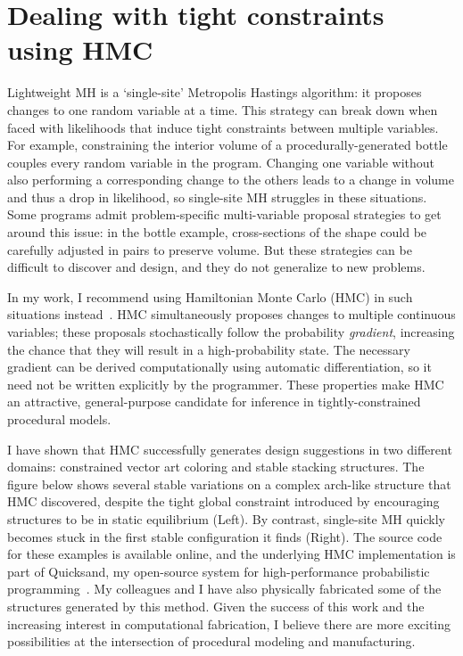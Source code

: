 \documentclass[
10pt, %
a4paper, %
oneside, %
headinclude,footinclude, %
BCOR5mm, %
]{scrartcl}
\begin{document}
\section*{Dealing with tight constraints using HMC}

Lightweight MH is a `single-site' Metropolis Hastings algorithm: it proposes changes to one random variable at a time. This strategy can break down when faced with likelihoods that induce tight constraints between multiple variables. For example, constraining the interior volume of a procedurally-generated bottle couples every random variable in the program. Changing one variable without also performing a corresponding change to the others leads to a change in volume and thus a drop in likelihood, so single-site MH struggles in these situations. Some programs admit problem-specific multi-variable proposal strategies to get around this issue: in the bottle example, cross-sections of the shape could be carefully adjusted in pairs to preserve volume. But these strategies can be difficult to discover and design, and they do not generalize to new problems.

In my work, I recommend using Hamiltonian Monte Carlo (HMC) in such situations instead~\cite{GraphicsHMC}. HMC simultaneously proposes changes to multiple continuous variables; these proposals stochastically follow the probability \emph{gradient}, increasing the chance that they will result in a high-probability state. The necessary gradient can be derived computationally using automatic differentiation, so it need not be written explicitly by the programmer. These properties make HMC an attractive, general-purpose candidate for inference in tightly-constrained procedural models.

I have shown that HMC successfully generates design suggestions in two different domains: constrained vector art coloring and stable stacking structures. The figure below shows several stable variations on a complex arch-like structure that HMC discovered, despite the tight global constraint introduced by encouraging structures to be in static equilibrium (Left). By contrast, single-site MH quickly becomes stuck in the first stable configuration it finds (Right). The source code for these examples is available online, and the underlying HMC implementation is part of Quicksand, my open-source system for high-performance probabilistic programming~\cite{Quicksand}. My colleagues and I have also physically fabricated some of the structures generated by this method. Given the success of this work and the increasing interest in computational fabrication, I believe there are more exciting possibilities at the intersection of procedural modeling and manufacturing.
\end{document}
